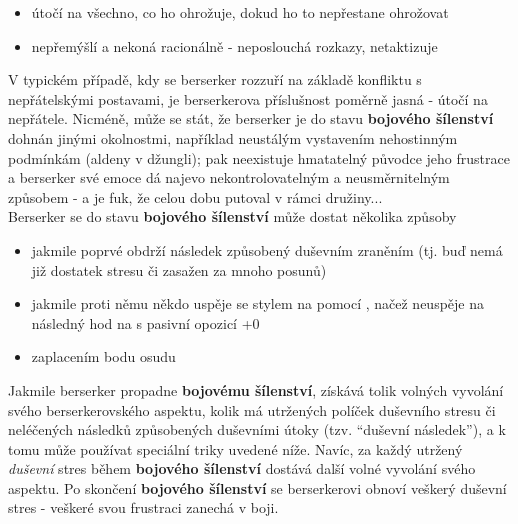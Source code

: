 \begin{itemize}
\item útočí na všechno, co ho ohrožuje, dokud ho to nepřestane ohrožovat
\item nepřemýšlí a nekoná racionálně - neposlouchá rozkazy, netaktizuje
\end{itemize}
V typickém případě, kdy se berserker rozzuří na základě konfliktu s nepřátelskými postavami, je berserkerova příslušnost poměrně jasná - útočí na nepřátele. Nicméně, může se stát, že berserker je do stavu \textbf{bojového šílenství} dohnán jinými okolnostmi, například neustálým vystavením nehostinným podmínkám (aldeny v džungli); pak neexistuje hmatatelný původce jeho frustrace a berserker své emoce dá najevo nekontrolovatelným a neusměrnitelným způsobem - a je fuk, že celou dobu putoval v rámci družiny...\\
Berserker se do stavu \textbf{bojového šílenství} může dostat několika způsoby
\begin{itemize}
\item jakmile poprvé obdrží následek způsobený duševním zraněním (tj. buď nemá již dostatek stresu či zasažen za mnoho posunů)
\item jakmile proti němu někdo uspěje se stylem na  pomocí , načež neuspěje na následný hod na  s pasivní opozicí +0
\item zaplacením bodu osudu
\end{itemize}

Jakmile berserker propadne \textbf{bojovému šílenství}, získává tolik volných vyvolání svého berserkerovského aspektu, kolik má utržených políček duševního stresu či neléčených následků způsobených duševními útoky (tzv. ``duševní následek''), a k tomu může používat speciální triky uvedené níže. Navíc, za každý utržený \textit{duševní} stres během \textbf{bojového šílenství} dostává další volné vyvolání svého aspektu. Po skončení \textbf{bojového šílenství} se berserkerovi obnoví veškerý duševní stres - veškeré svou frustraci zanechá v boji.

